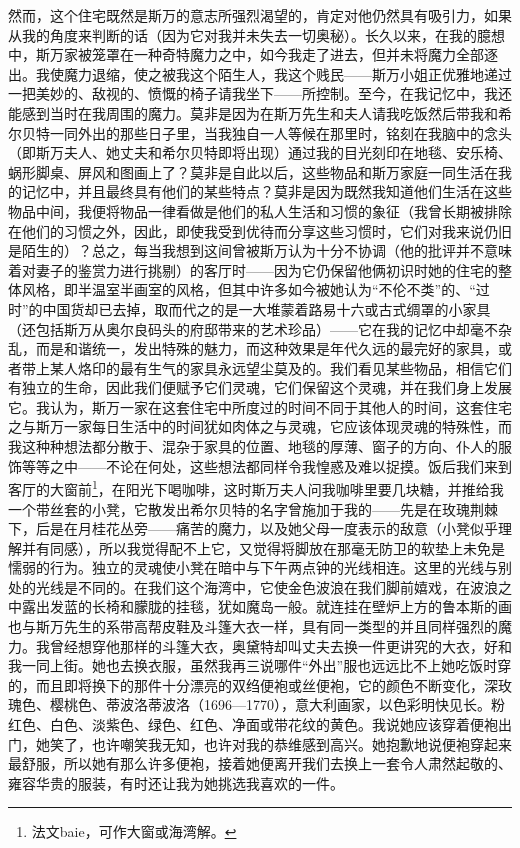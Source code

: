 \par 然而，这个住宅既然是斯万的意志所强烈渴望的，肯定对他仍然具有吸引力，如果从我的角度来判断的话（因为它对我并未失去一切奥秘）。长久以来，在我的臆想中，斯万家被笼罩在一种奇特魔力之中，如今我走了进去，但并未将魔力全部逐出。我使魔力退缩，使之被我这个陌生人，我这个贱民——斯万小姐正优雅地递过一把美妙的、敌视的、愤慨的椅子请我坐下——所控制。至今，在我记忆中，我还能感到当时在我周围的魔力。莫非是因为在斯万先生和夫人请我吃饭然后带我和希尔贝特一同外出的那些日子里，当我独自一人等候在那里时，铭刻在我脑中的念头（即斯万夫人、她丈夫和希尔贝特即将出现）通过我的目光刻印在地毯、安乐椅、蜗形脚桌、屏风和图画上了？莫非是自此以后，这些物品和斯万家庭一同生活在我的记忆中，并且最终具有他们的某些特点？莫非是因为既然我知道他们生活在这些物品中间，我便将物品一律看做是他们的私人生活和习惯的象征（我曾长期被排除在他们的习惯之外，因此，即使我受到优待而分享这些习惯时，它们对我来说仍旧是陌生的）？总之，每当我想到这间曾被斯万认为十分不协调（他的批评并不意味着对妻子的鉴赏力进行挑剔）的客厅时——因为它仍保留他俩初识时她的住宅的整体风格，即半温室半画室的风格，但其中许多如今被她认为“不伦不类”的、“过时”的中国货却已去掉，取而代之的是一大堆蒙着路易十六或古式绸罩的小家具（还包括斯万从奥尔良码头的府邸带来的艺术珍品）——它在我的记忆中却毫不杂乱，而是和谐统一，发出特殊的魅力，而这种效果是年代久远的最完好的家具，或者带上某人烙印的最有生气的家具永远望尘莫及的。我们看见某些物品，相信它们有独立的生命，因此我们便赋予它们灵魂，它们保留这个灵魂，并在我们身上发展它。我认为，斯万一家在这套住宅中所度过的时间不同于其他人的时间，这套住宅之与斯万一家每日生活中的时间犹如肉体之与灵魂，它应该体现灵魂的特殊性，而我这种种想法都分散于、混杂于家具的位置、地毯的厚薄、窗子的方向、仆人的服饰等等之中——不论在何处，这些想法都同样令我惶惑及难以捉摸。饭后我们来到客厅的大窗前\footnote{法文baie，可作大窗或海湾解。}，在阳光下喝咖啡，这时斯万夫人问我咖啡里要几块糖，并推给我一个带丝套的小凳，它散发出希尔贝特的名字曾施加于我的——先是在玫瑰荆棘下，后是在月桂花丛旁——痛苦的魔力，以及她父母一度表示的敌意（小凳似乎理解并有同感），所以我觉得配不上它，又觉得将脚放在那毫无防卫的软垫上未免是懦弱的行为。独立的灵魂使小凳在暗中与下午两点钟的光线相连。这里的光线与别处的光线是不同的。在我们这个海湾中，它使金色波浪在我们脚前嬉戏，在波浪之中露出发蓝的长椅和朦胧的挂毯，犹如魔岛一般。就连挂在壁炉上方的鲁本斯的画也与斯万先生的系带高帮皮鞋及斗篷大衣一样，具有同一类型的并且同样强烈的魔力。我曾经想穿他那样的斗篷大衣，奥黛特却叫丈夫去换一件更讲究的大衣，好和我一同上街。她也去换衣服，虽然我再三说哪件“外出”服也远远比不上她吃饭时穿的，而且即将换下的那件十分漂亮的双绉便袍或丝便袍，它的颜色不断变化，深玫瑰色、樱桃色、蒂波洛蒂波洛（1696—1770），意大利画家，以色彩明快见长。粉红色、白色、淡紫色、绿色、红色、净面或带花纹的黄色。我说她应该穿着便袍出门，她笑了，也许嘲笑我无知，也许对我的恭维感到高兴。她抱歉地说便袍穿起来最舒服，所以她有那么许多便袍，接着她便离开我们去换上一套令人肃然起敬的、雍容华贵的服装，有时还让我为她挑选我喜欢的一件。
